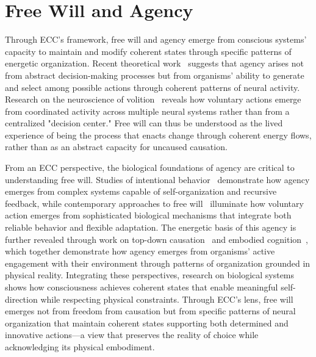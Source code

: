 \section{Free Will and Agency}

Through ECC's framework, free will and agency emerge from conscious systems' capacity to maintain and modify coherent states through specific patterns of energetic organization. Recent theoretical work~\cite{Deacon2011, pinotsis2023cytoelectric} suggests that agency arises not from abstract decision-making processes but from organisms' ability to generate and select among possible actions through coherent patterns of neural activity. Research on the neuroscience of volition~\cite{Clark2001, kukushkin2024massed} reveals how voluntary actions emerge from coordinated activity across multiple neural systems rather than from a centralized "decision center." Free will can thus be understood as the lived experience of being the process that enacts change through coherent energy flows, rather than as an abstract capacity for uncaused causation.

From an ECC perspective, the biological foundations of agency are critical to understanding free will. Studies of intentional behavior~\cite{Juarrero1999, van2025processes} demonstrate how agency emerges from complex systems capable of self-organization and recursive feedback, while contemporary approaches to free will~\cite{Dennett2003, hunt2024electromagnetic} illuminate how voluntary action emerges from sophisticated biological mechanisms that integrate both reliable behavior and flexible adaptation. The energetic basis of this agency is further revealed through work on top-down causation~\cite{Ellis2016, bosl2025dynamical} and embodied cognition~\cite{Noe2009, zheng2025unbearable}, which together demonstrate how agency emerges from organisms' active engagement with their environment through patterns of organization grounded in physical reality. Integrating these perspectives, research on biological systems~\cite{Barandiaran2009, amil2024theta} shows how consciousness achieves coherent states that enable meaningful self-direction while respecting physical constraints. Through ECC's lens, free will emerges not from freedom from causation but from specific patterns of neural organization that maintain coherent states supporting both determined and innovative actions—a view that preserves the reality of choice while acknowledging its physical embodiment.

